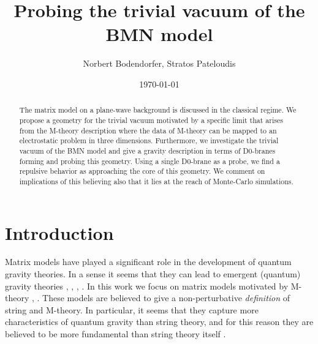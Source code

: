 \documentclass[11pt,english]{article}
\numberwithin{equation}{section}
\begin{document}
	\title{Probing the trivial vacuum of the BMN model}
	\author{Norbert Bodendorfer,  Stratos Pateloudis}  
	
	
	\date{\today}
	
	\maketitle
	
\begin{abstract}
 The matrix model on a plane-wave background is discussed in the classical regime.  We propose a geometry for the trivial vacuum motivated by a specific limit that arises from the M-theory description where the data of M-theory can be mapped to an electrostatic problem in three dimensions. Furthermore, we investigate the trivial vacuum of the BMN model and give a gravity description in terms of D0-branes forming and probing this geometry. Using a single D0-brane as a probe, we find a repulsive behavior as approaching the core of this geometry. We comment on implications of this believing also that it lies at the reach of Monte-Carlo simulations.    
\end{abstract}

\newpage

\section{Introduction}

Matrix models have played a significant role in the development of quantum gravity theories. In a sense it seems that they can lead to emergent (quantum) gravity theories \cite{Hooft1974},  \cite{DiFrancesco},  \cite{DijkgraafMatrixStringTheory}, \cite{Klebanov1991}. In this work we focus on matrix models motivated by M-theory \cite{Banks1997}, \cite{Berenstein2002}. These models are believed to give a non-perturbative \textit{definition} of string and M-theory. In particular, it seems that they capture more characteristics of quantum gravity than string theory, and for this reason they are believed to be more fundamental than string theory itself \cite{Taylor2001}. 
\end{document}
